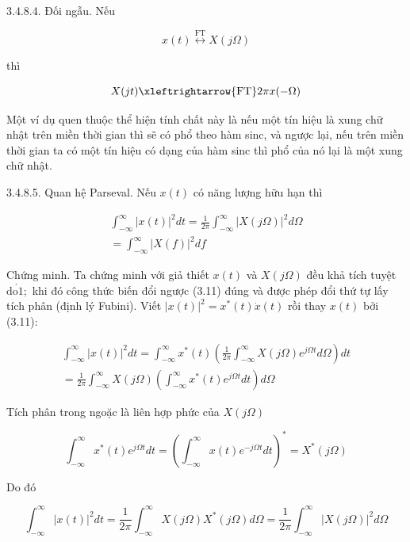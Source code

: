 \documentclass[
  10
]{article}
\begin{document}
3.4.8.4. Đối ngẫu. Nếu

\[
x (t) \stackrel {\mathrm{FT}} {\longleftrightarrow} X (j \Omega)
\]

thì

\[
X (j t) \xleftrightarrow {\mathrm{FT}} 2 \pi x (- \Omega)
\]

Một ví dụ quen thuộc thể hiện tính chất này là nếu một tín hiệu là xung
chữ nhật trên miền thời gian thì sẽ có phổ theo hàm sinc, và ngược lại,
nếu trên miền thời gian ta có một tín hiệu có dạng của hàm sinc thì phổ
của nó lại là một xung chữ nhật.

3.4.8.5. Quan hệ Parseval. Nếu \(x ( t )\) có năng lượng hữu hạn thì

\[
\begin{array}{r} \int_ {- \infty} ^ {\infty} | x (t) | ^ {2} d t = \frac {1}{2 \pi} \int_ {- \infty} ^ {\infty} | X (j \Omega) | ^ {2} d \Omega \\ = \int_ {- \infty} ^ {\infty} | X (f) | ^ {2} d f \end{array}
\]

Chứng minh. Ta chứng minh với giả thiết \(x ( t )\) và
\(X ( j \Omega )\) đều khả tích tuyệt
\(\mathrm { d } \acute { \mathrm { o 1 } } ;\) khi đó công thức biến đổi
ngược (3.11) đúng và được phép đổi thứ tự lấy tích phân (định lý
Fubini). Viết
\(| x ( t ) | ^ { 2 } = x ^ { * } ( t ) { \dot { x } } ( t )\) rồi thay
\(x ( t )\) bởi (3.11):

\[
\begin{array}{r} \int_ {- \infty} ^ {\infty} | x (t) | ^ {2} d t = \int_ {- \infty} ^ {\infty} x ^ {*} (t) \left(\frac {1}{2 \pi} \int_ {- \infty} ^ {\infty} X (j \Omega) e ^ {j \Omega t} d \Omega\right) d t \\ = \frac {1}{2 \pi} \int_ {- \infty} ^ {\infty} X (j \Omega) \left(\int_ {- \infty} ^ {\infty} x ^ {*} (t) e ^ {j \Omega t} d t\right) d \Omega \end{array}
\]

Tích phân trong ngoặc là liên hợp phức của \(X ( j \Omega )\)

\[
\int_ {- \infty} ^ {\infty} x ^ {*} (t) e ^ {j \Omega t} d t = \left(\int_ {- \infty} ^ {\infty} x (t) e ^ {- j \Omega t} d t\right) ^ {*} = X ^ {*} (j \Omega)
\]

Do đó

\[
\int_ {- \infty} ^ {\infty} | x (t) | ^ {2} d t = \frac {1}{2 \pi} \int_ {- \infty} ^ {\infty} X (j \Omega) X ^ {*} (j \Omega) d \Omega = \frac {1}{2 \pi} \int_ {- \infty} ^ {\infty} | X (j \Omega) | ^ {2} d \Omega
\]
\end{document}
